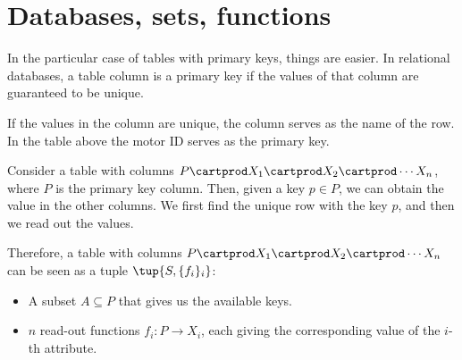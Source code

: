 
\section{Databases, sets, functions}

%
%
%


In the particular case of tables with primary keys, things are easier.
In relational databases, a table column is a primary key if the values of that column are guaranteed to be unique.

If the values in the column are unique, the column serves as the name of the row.
In the table above the motor ID serves as the primary key.

Consider a table with columns $P \cartprod X_1 \cartprod X_2 \cartprod \cdots X_n$, where $P$ is the primary key column.
Then, given a key $p \in P$, we can obtain the value in the other columns.
We first find the unique row with the key $p$, and then we read out the values.

Therefore, a table with columns $P \cartprod X_1 \cartprod X_2 \cartprod \cdots X_n$ can be seen as a tuple $\tup{S, \{f_i\}_i}$:
\begin{itemize}
    \item A subset $A \subseteq P$ that gives us the available keys.
    \item $n$ read-out functions $f_i\colon P \to X_i$, each giving the corresponding value of the $i$-th attribute.
\end{itemize}


